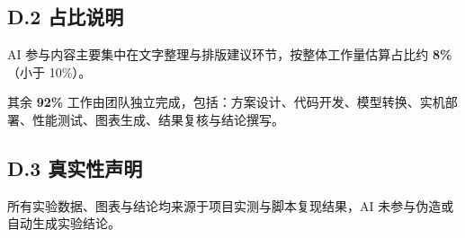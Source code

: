 \documentclass[12pt,a4paper]{ctexart}
\begin{document}
\subsection*{D.2 占比说明}
AI 参与内容主要集中在文字整理与排版建议环节，按整体工作量估算占比约 \textbf{8\%}（小于 10\%）。

其余 \textbf{92\%} 工作由团队独立完成，包括：方案设计、代码开发、模型转换、实机部署、性能测试、图表生成、结果复核与结论撰写。

\subsection*{D.3 真实性声明}
所有实验数据、图表与结论均来源于项目实测与脚本复现结果，AI 未参与伪造或自动生成实验结论。
\end{document}

